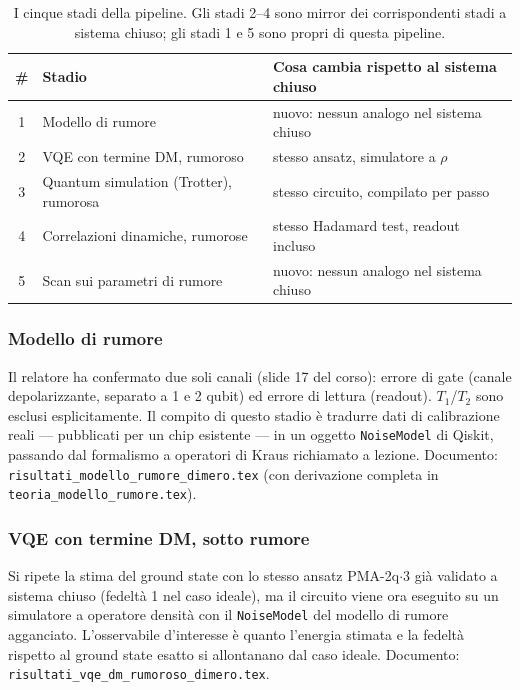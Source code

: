 \documentclass[11pt,a4paper]{article}
\begin{document}
\begin{table}[htbp]
\centering
\begin{tabular}{@{}cll@{}}
\toprule
\# & Stadio & Cosa cambia rispetto al sistema chiuso \\
\midrule
1 & Modello di rumore & nuovo: nessun analogo nel sistema chiuso \\
2 & VQE con termine DM, rumoroso & stesso ansatz, simulatore a $\rho$ \\
3 & Quantum simulation (Trotter), rumorosa & stesso circuito, compilato per passo \\
4 & Correlazioni dinamiche, rumorose & stesso Hadamard test, readout incluso \\
5 & Scan sui parametri di rumore & nuovo: nessun analogo nel sistema chiuso \\
\bottomrule
\end{tabular}
\caption{I cinque stadi della pipeline. Gli stadi 2--4 sono mirror dei
corrispondenti stadi a sistema chiuso; gli stadi 1 e 5 sono propri di
questa pipeline.}
\end{table}
\FloatBarrier

\subsubsection{Modello di rumore}

Il relatore ha confermato due soli canali (slide 17 del corso): errore
di gate (canale depolarizzante, separato a 1 e 2 qubit) ed errore di
lettura (readout). $T_1$/$T_2$ sono esclusi esplicitamente. Il compito
di questo stadio è tradurre dati di calibrazione reali --- pubblicati
per un chip esistente --- in un oggetto \texttt{NoiseModel} di Qiskit,
passando dal formalismo a operatori di Kraus richiamato a lezione.
Documento: \texttt{risultati\_modello\_rumore\_dimero.tex} (con
derivazione completa in \texttt{teoria\_modello\_rumore.tex}).

\subsubsection{VQE con termine DM, sotto rumore}

Si ripete la stima del ground state con lo stesso ansatz PMA-2q$\cdot$3
già validato a sistema chiuso (fedeltà 1 nel caso ideale), ma il
circuito viene ora eseguito su un simulatore a operatore densità con il
\texttt{NoiseModel} del modello di rumore agganciato. L'osservabile
d'interesse è quanto l'energia stimata e la fedeltà rispetto al ground
state esatto si allontanano dal caso ideale. Documento:
\texttt{risultati\_vqe\_dm\_rumoroso\_dimero.tex}.
\end{document}
